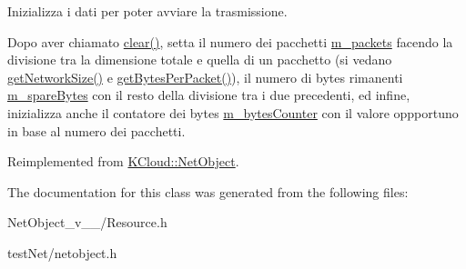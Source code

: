 Inizializza i dati per poter avviare la trasmissione. 

Dopo aver chiamato \hyperlink{class_k_cloud_1_1_resource_aa1f3747d1d39bff3f659d499f0a65c79}{clear()}, setta il numero dei pacchetti \hyperlink{}{m\-\_\-packets} facendo la divisione tra la dimensione totale e quella di un pacchetto (si vedano \hyperlink{class_k_cloud_1_1_net_object_a44835b59c4c1658e3529a8e752f3a3ca}{get\-Network\-Size()} e \hyperlink{}{get\-Bytes\-Per\-Packet()}), il numero di bytes rimanenti \hyperlink{}{m\-\_\-spare\-Bytes} con il resto della divisione tra i due precedenti, ed infine, inizializza anche il contatore dei bytes \hyperlink{}{m\-\_\-bytes\-Counter} con il valore oppportuno in base al numero dei pacchetti. 

Reimplemented from \hyperlink{class_k_cloud_1_1_net_object_abe21fc2011a6d6565d464cec00400c5d}{K\-Cloud\-::\-Net\-Object}.



The documentation for this class was generated from the following files\-:\begin{DoxyCompactItemize}
\item 
Net\-Object\-\_\-v\-\_\-\_/Resource.\-h\item 
test\-Net/netobject.\-h\end{DoxyCompactItemize}
